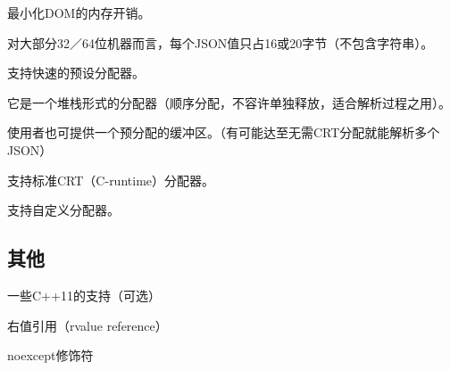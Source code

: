 \begin{DoxyItemize}
\item 最小化\+D\+O\+M的内存开销。
\begin{DoxyItemize}
\item 对大部分32／64位机器而言，每个\+J\+S\+O\+N值只占16或20字节（不包含字符串）。
\end{DoxyItemize}
\item 支持快速的预设分配器。
\begin{DoxyItemize}
\item 它是一个堆栈形式的分配器（顺序分配，不容许单独释放，适合解析过程之用）。
\item 使用者也可提供一个预分配的缓冲区。（有可能达至无需\+C\+R\+T分配就能解析多个\+J\+S\+O\+N）
\end{DoxyItemize}
\item 支持标准\+C\+R\+T（\+C-\/runtime）分配器。
\item 支持自定义分配器。
\end{DoxyItemize}

\subsection*{其他}


\begin{DoxyItemize}
\item 一些\+C++11的支持（可选）
\begin{DoxyItemize}
\item 右值引用（rvalue reference）
\item {\ttfamily noexcept}修饰符 
\end{DoxyItemize}
\end{DoxyItemize}